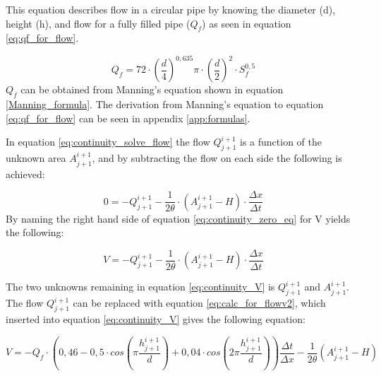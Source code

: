 This equation describes flow in a circular pipe by knowing the diameter (d), height (h), and flow for a fully filled pipe ($Q_f$) as seen in equation \ref{eq:qf_for_flow}. %

\begin{equation}\label{eq:qf_for_flow}
    Q_f =72\cdot \left(\frac{d}{4}\right)^{0,635}\pi\cdot\left(\frac{d}{2}\right)^2\cdot S_f^{0,5}%
\end{equation}
$Q_f$ can be obtained from Manning's equation shown in equation \ref{Manning_formula}. The derivation from Manning's equation to equation \ref{eq:qf_for_flow} can be seen in appendix \ref{app:formulas}.

In equation \ref{eq:continuity_solve_flow} the flow $Q_{j+1}^{i+1}$ is a function of the unknown area $A_{j+1}^{i+1}$, and by subtracting the flow on each side the following is achieved:

\begin{equation}\label{eq:continuity_zero_eq}
        0=-Q_{j+1}^{i+1}  - \frac{1}{2\theta}\cdot\left(A_{j+1}^{i+1}-H\right)\cdot \frac{\Delta x}{\Delta t}
\end{equation}
By naming the right hand side of equation \ref{eq:continuity_zero_eq} for V yields the following:

\begin{equation}\label{eq:continuity_V}
        V=-Q_{j+1}^{i+1}  - \frac{1}{2\theta}\cdot\left(A_{j+1}^{i+1}-H\right)\cdot \frac{\Delta x}{\Delta t}
\end{equation}

The two unknowns remaining in equation \ref{eq:continuity_V} is $Q_{j+1}^{i+1}$ and $A_{j+1}^{i+1}$. The flow $Q_{j+1}^{i+1}$ can be replaced with equation \ref{eq:calc_for_flowv2}, which inserted into equation \ref{eq:continuity_V} gives the following equation:

\begin{equation}\label{eq:V_with_flow}
    V = -Q_f\cdot\left(0,46-0,5\cdot cos\left(\pi \frac{h_{j+1}^{i+1}}{d}\right)+0,04\cdot cos\left(2\pi\frac{h_{j+1}^{i+1}}{d}\right)\right)\frac{\Delta t}{\Delta x}-\frac{1}{2\theta}\left(A_{j+1}^{i+1}-H\right)
\end{equation}

